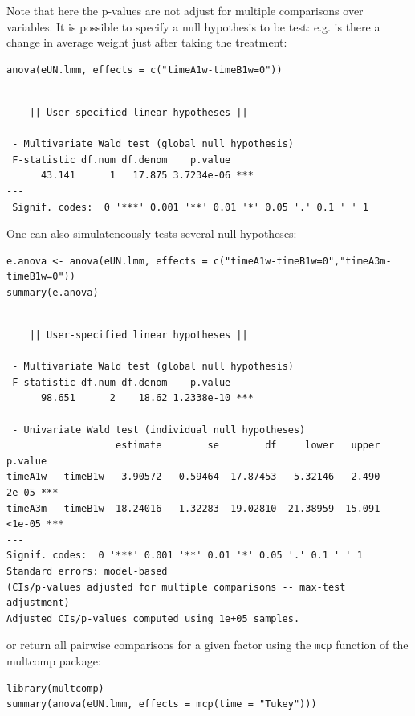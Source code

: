 \documentclass[12pt]{article}
\begin{document}
Note that here the p-values are not adjust for multiple comparisons
over variables. It is possible to specify a null hypothesis to be
test: e.g. is there a change in average weight just after taking the
treatment:
\lstset{language=r,label= ,caption= ,captionpos=b,numbers=none}
\begin{lstlisting}
anova(eUN.lmm, effects = c("timeA1w-timeB1w=0"))
\end{lstlisting}

\begin{verbatim}

	|| User-specified linear hypotheses || 

 - Multivariate Wald test (global null hypothesis)
 F-statistic df.num df.denom    p.value    
      43.141      1   17.875 3.7234e-06 ***
---
 Signif. codes:  0 '***' 0.001 '**' 0.01 '*' 0.05 '.' 0.1 ' ' 1
\end{verbatim}


One can also simulateneously tests several null hypotheses:
\lstset{language=r,label= ,caption= ,captionpos=b,numbers=none}
\begin{lstlisting}
e.anova <- anova(eUN.lmm, effects = c("timeA1w-timeB1w=0","timeA3m-timeB1w=0"))
summary(e.anova)
\end{lstlisting}

\begin{verbatim}

	|| User-specified linear hypotheses || 

 - Multivariate Wald test (global null hypothesis)
 F-statistic df.num df.denom    p.value    
      98.651      2    18.62 1.2338e-10 ***

 - Univariate Wald test (individual null hypotheses) 
                   estimate        se        df     lower   upper p.value    
timeA1w - timeB1w  -3.90572   0.59464  17.87453  -5.32146  -2.490   2e-05 ***
timeA3m - timeB1w -18.24016   1.32283  19.02810 -21.38959 -15.091  <1e-05 ***
---
Signif. codes:  0 '***' 0.001 '**' 0.01 '*' 0.05 '.' 0.1 ' ' 1
Standard errors: model-based
(CIs/p-values adjusted for multiple comparisons -- max-test adjustment)
Adjusted CIs/p-values computed using 1e+05 samples.
\end{verbatim}

or return all pairwise comparisons for a given factor using the \texttt{mcp}
function of the multcomp package:
\lstset{language=r,label= ,caption= ,captionpos=b,numbers=none}
\begin{lstlisting}
library(multcomp)
summary(anova(eUN.lmm, effects = mcp(time = "Tukey")))
\end{lstlisting}
\end{document}
